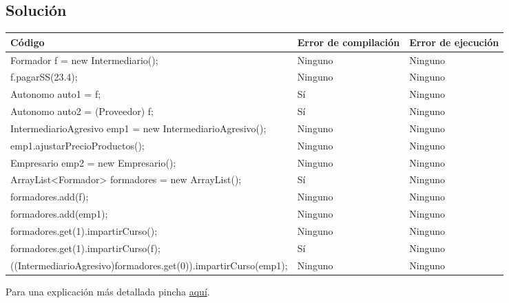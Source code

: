 \documentclass[a4paper,12pt]{article}
\begin{document}
\subsection{Solución}

\begin{table}[H]
    \centering
    \begin{tabular}{|l|p{2.5cm}|p{2 cm}|}
        \hline
        \textbf{Código} & \textbf{Error de compilación} & \textbf{Error de ejecución} \\ \hline
        Formador f = new Intermediario(); & Ninguno & Ninguno \\ \hline
        f.pagarSS(23.4); & Ninguno & Ninguno \\ \hline
        Autonomo auto1 = f; & Sí & Ninguno \\ \hline
        Autonomo auto2 = (Proveedor) f; & Sí & Ninguno \\ \hline
        IntermediarioAgresivo emp1 = new IntermediarioAgresivo(); & Ninguno & Ninguno \\ \hline
        emp1.ajustarPrecioProductos(); & Ninguno & Ninguno \\ \hline
        Empresario emp2 = new Empresario(); & Ninguno & Ninguno \\ \hline
        ArrayList<Formador> formadores = new ArrayList(); & Sí & Ninguno \\ \hline
        formadores.add(f); & Ninguno & Ninguno \\ \hline
        formadores.add(emp1); & Ninguno & Ninguno \\ \hline
        formadores.get(1).impartirCurso(); & Ninguno & Ninguno \\ \hline
        formadores.get(1).impartirCurso(f); & Sí & Ninguno \\ \hline
        ((IntermediarioAgresivo)formadores.get(0)).impartirCurso(emp1); & Ninguno & Ninguno \\ \hline
    \end{tabular}
\end{table}


Para una explicación más detallada pincha \href{https://github.com/ElblogdeIsmael/ElblogdeIsmael.github.io/tree/main/Asignaturas/Tercer%20A%C3%B1o/PDOO/Teoria/RelacionesEjercicios/Solt3/ETSIIT/explicacion_ej15.md}{aquí}.
\end{document}
